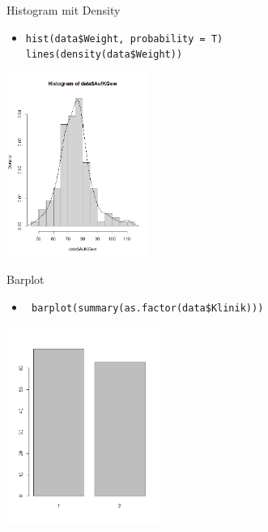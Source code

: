 \documentclass[xcolor=dvipsnames, aspectratio = 169]{beamer}
\begin{document}
\begin{frame}[fragile]{Histogram mit Density}
	\begin{itemize}
		\item \verb+hist(data$Weight, probability = T) + \\ \verb +lines(density(data$Weight))+
	\end{itemize}
			
	\begin{center}
		\includegraphics[height=6cm]{Density}
	\end{center}
\end{frame}

\begin{frame}[fragile]{Barplot}
	\begin{itemize}
		\item \verb+ barplot(summary(as.factor(data$Klinik)))+
	\end{itemize}
			
	\begin{center}
		\includegraphics[height=6.5cm]{Barplot}
	\end{center}
\end{frame}
\end{document}
